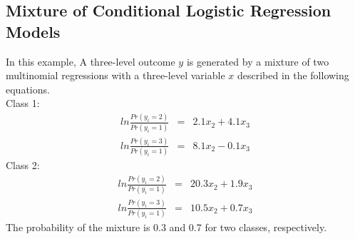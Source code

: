 \documentclass[nojss]{jss}
\begin{document}
   \subsection{Mixture of Conditional Logistic Regression Models}
   In this example, A three-level outcome $y$ is generated by a mixture of two multinomial regressions with a three-level variable $x$ described in the following equations. \\
   Class 1: \\
   \begin{eqnarray}
   ln \frac{Pr(y_i = 2)}{Pr(y_i = 1)} &=& 2.1 x_2 + 4.1 x_3 \\
   ln \frac{Pr(y_i = 3)}{Pr(y_i = 1)} &=& 8.1 x_2 - 0.1 x_3
   \end{eqnarray}
   Class 2: \\
   \begin{eqnarray}
   ln \frac{Pr(y_i = 2)}{Pr(y_i = 1)} &=& 20.3 x_2 + 1.9 x_3 \\
   ln \frac{Pr(y_i = 3)}{Pr(y_i = 1)} &=& 10.5 x_2 + 0.7 x_3
   \end{eqnarray}   
   The probability of the mixture is 0.3 and 0.7 for two classes, respectively.
\end{document}
